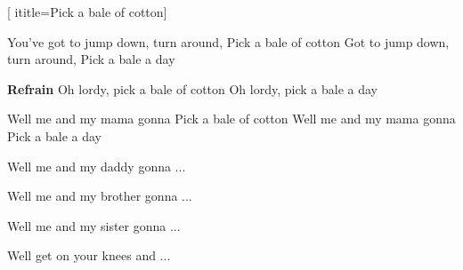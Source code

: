  [
ititle={Pick a bale of cotton}]

\beginverse
You've got to jump down, turn around,
Pick a bale of cotton
Got to jump down, turn around, 
Pick a bale a day
\endverse

\beginchorus
\textbf{Refrain}
Oh lordy, pick a bale of cotton
Oh lordy, pick a bale a day
\endchorus

\beginverse
Well me and my mama gonna
Pick a bale of cotton
Well me and my mama gonna
Pick a bale a day
\endverse

\beginverse
Well me and my daddy gonna ...
\endverse

\beginverse
Well me and my brother gonna ...
\endverse

\beginverse
Well me and my sister gonna ...
\endverse

\beginverse
Well get on your knees and ...
\endverse
\endsong